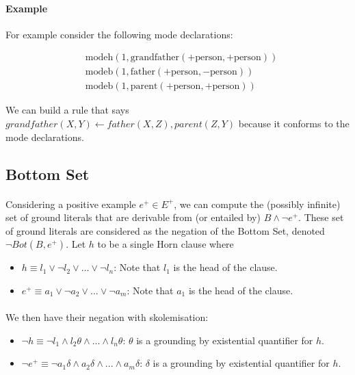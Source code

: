 \documentclass{article}
\theoremstyle{plain}
\theoremstyle{definition}
\begin{document}
\begin{multicols}{2}
\paragraph{Example} For example consider the following mode declarations:

\begin{align*}
	&\text{modeh}(1, \text{grandfather}(+\text{person}, +\text{person}))\\
	&\text{modeb}(1, \text{father}(+\text{person}, -\text{person}))\\
	&\text{modeb}(1, \text{parent}(+\text{person}, +\text{person}))
\end{align*}

We can build a rule that says $grandfather(X, Y) \leftarrow father(X, Z), parent(Z, Y)$ because it conforms to the mode declarations.

\subsection{Bottom Set}

\paragraph{} Considering a positive example $e^+ \in E^+$, we can compute the (possibly infinite) set of ground literals that are derivable from (or entailed by) $B \land \lnot e^+$. These set of ground literals are considered as the negation of the Bottom Set, denoted $\lnot Bot(B, e^+)$. Let $h$ to be a single Horn clause where

\begin{itemize}
\item $h \equiv l_1 \lor \lnot l_2 \lor ... \lor \lnot l_n$: Note that $l_1$ is the head of the clause.
\item $e^+ \equiv a_1 \lor \lnot a_2 \lor ... \lor \lnot a_m$: Note that $a_1$ is the head of the clause.
\end{itemize}

\paragraph{} We then have their negation with skolemisation:

\begin{itemize}
\item $\lnot h \equiv \lnot l_1 \land l_2\theta \land ... \land l_n\theta$: $\theta$ is a grounding by existential quantifier for $h$.
\item $\lnot e^+ \equiv \lnot a_1\delta \land a_2\delta \land ... \land a_m\delta$: $\delta$ is a grounding by existential quantifier for $h$.
\end{itemize}


\end{multicols}
\end{document}
